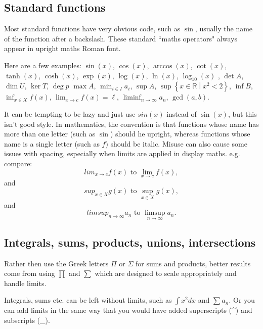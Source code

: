 \documentclass[a4paper,11pt]{article}
\begin{document}
\subsection{Standard functions}

Most standard functions have very obvious code, such as $\sin$, usually the name of the function after a backslash. These standard ``maths operators" always appear in upright maths Roman font.

Here are a few examples:
$\sin(x)$, $\cos(x)$,  $\arccos(x) $, $\cot(x)$, 	%
$\tanh(x)$, $\cosh(x)$, 							%
$\exp(x)$, $\log(x)$, $\ln(x)$, $\log_{10}(x)$ ,  	%
$\det A$, $\dim U$, $\ker T$, $\deg p $ 			%
$\max A$, $\min_{i \in I} a_i$,	 					%
$\sup A$, $\sup \left \{x \in \mathbb{R} \middle | x^2 <2\right \}$, 
$\inf B$, $\inf_{x \in X} f(x)$,   					%
$\lim_{x \to c} f(x)=\ell$,  $\liminf_{n \to \infty} a_n$, %
$\gcd (a,b)$. %

It can be tempting to be lazy and just use $sin(x)$ instead of $\sin(x)$, but this isn't good style. In mathematics, the convention is that functions whose name has more than one letter (such as $\sin$) should he upright, whereas functions whose name is a single letter (such as $f$) should be italic. Misuse can also cause some issues with spacing, especially when limits are applied in display maths. e.g. compare:
\[ 
lim_{x \to c} f(x) \text { to } \lim_{x \to c} f(x),
\]
and 
\[
sup_{x \in X} g(x) \text{ to } \sup_{x \in X} g(x),
\]
and 
\[
limsup_{n \to \infty} a_n \text{ to } \limsup_{n \to \infty} a_n.
\]



\subsection{Integrals, sums, products, unions, intersections}

Rather then use the Greek letters $\Pi$ or $\Sigma$ for sums and products, better results come from using $\prod$ and $\sum$ which are designed to scale appropriately and handle limits.

Integrals, sums etc. can be left without limits, such as $\int x^2 dx$ and $\sum a_n$. Or you can add limits in the same way that you would have added superscripts (\^{}) and subscripts (\_). 
\end{document}
